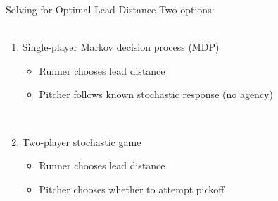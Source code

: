 \documentclass{beamer}
\begin{document}
  \begin{frame}{Solving for Optimal Lead Distance}
    Two options:\\
    ~\\
    \begin{enumerate}
      \item Single-player Markov decision process (MDP)
      \begin{itemize}
        \item Runner chooses lead distance
        \item Pitcher follows known stochastic response (no agency)
      \end{itemize}
      ~\\
      \item Two-player stochastic game
      \begin{itemize}
        \item Runner chooses lead distance
        \item Pitcher chooses whether to attempt pickoff
      \end{itemize}
    \end{enumerate}
  \end{frame}
\end{document}

